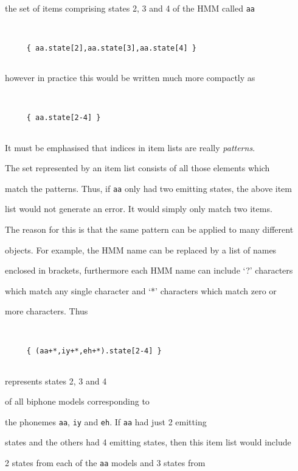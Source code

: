 the set of items comprising states 2, 3 and 4 of the HMM called \texttt{aa}


\begin{verbatim}


     { aa.state[2],aa.state[3],aa.state[4] }


\end{verbatim}


however in practice this would be written much more compactly as


\begin{verbatim}


     { aa.state[2-4] }


\end{verbatim}


It must be emphasised that indices in item lists are really {\it patterns}.


The set represented by an item list consists of all those elements which


match the patterns.  Thus, if \texttt{aa} only had two emitting states, the above item


list would not generate an error.  It would simply only match two items.


The reason for this is that the same pattern can be applied to many different


objects.  For example, the HMM name can be replaced by a list of names 


enclosed in brackets, furthermore each HMM name can include `?' characters


which match any single character and `*' characters which match zero or


more characters.  Thus 


\begin{verbatim}


     { (aa+*,iy+*,eh+*).state[2-4] }


\end{verbatim}


represents states 2, 3 and 4  


of all biphone models corresponding to


the phonemes \texttt{aa}, \texttt{iy} and \texttt{eh}.  If \texttt{aa} had just 2 emitting


states and the others had 4 emitting states, then this item list would include


2 states from each of the \texttt{aa} models and 3 states from


